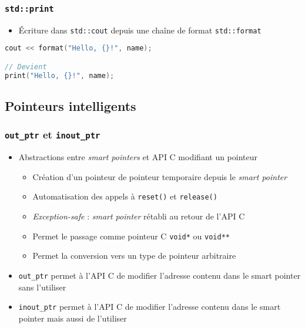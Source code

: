 \documentclass[C++.tex]{subfiles}
\begin{document}
\begin{frame}[fragile]
	\frametitle{\lstinline|std::print|}
	\begin{itemize}
		\item Écriture dans \lstinline|std::cout| depuis une chaîne de format \lstinline|std::format|
	\end{itemize}

	\begin{lstlisting}[language=C++]
cout << format("Hello, {}!", name);

// Devient
print("Hello, {}!", name);\end{lstlisting}
\end{frame}

\subsection*{Pointeurs intelligents}
\begin{frame}[fragile]
	\frametitle{\lstinline|out_ptr| et \lstinline|inout_ptr|}
	\begin{itemize}
		\item Abstractions entre \textit{smart pointers} et API C modifiant un pointeur


		\begin{itemize}
			\item Création d'un pointeur de pointeur temporaire depuis le \textit{smart pointer}
			\item Automatisation des appels à \lstinline|reset()| et \lstinline|release()|
			\item \textit{Exception-safe} : \textit{smart pointer} rétabli au retour de l'API C	


			\item Permet le passage comme pointeur C \lstinline|void*| ou \lstinline|void**|
			\item Permet la conversion vers un type de pointeur arbitraire
		\end{itemize}
		\item \lstinline|out_ptr| permet à l'API C de modifier l'adresse contenu dans le smart pointer sans l'utiliser
		\item \lstinline|inout_ptr| permet à l'API C de modifier l'adresse contenu dans le smart pointer mais aussi de l'utiliser
	\end{itemize}
\end{frame}
\end{document}

